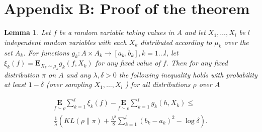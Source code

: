 \documentclass[letterpaper]{article} %
\newtheorem{lemma}{Lemma}
\begin{document}




  
 





\section{Appendix B: Proof of the theorem}


\begin{lemma} \cite{pentinaPACBayesianBoundLifelong2014} \label{lemma: pentina}
 Let $f$ be a random variable taking values in $A$ and let $X_1, \ldots, X_l$ be $l$ independent random variables with each $X_k$ distributed according to $\mu_k$ over the set $A_k$. For functions $g_k: A \times A_k \rightarrow\left[a_k, b_k\right], k=1 \ldots l$, let $\xi_k(f)=\mathbf{E}_{X_k \sim \mu_k} g_k\left(f, X_k\right)$ for any fixed value of $f$. Then for any fixed distribution $\pi$ on $A$ and any $\lambda, \delta>0$ the following inequality holds with probability at least $1-\delta$ (over sampling $X_1, \ldots, X_l$ ) for all distributions $\rho$ over $A$

$$
\begin{gathered}
\underset{f \sim \rho}{\mathbf{E}} \sum_{k=1}^l \xi_k(f)-\underset{f \sim \rho}{\mathbf{E}} \sum_{k=1}^l g_k\left(h, X_k\right) \leq \\
\frac{1}{\lambda}\left(K L(\rho \| \pi)+\frac{\lambda^2}{8} \sum_{k=1}^l\left(b_k-a_k\right)^2-\log \delta\right) .
\end{gathered}
$$
\end{lemma}
\end{document}
